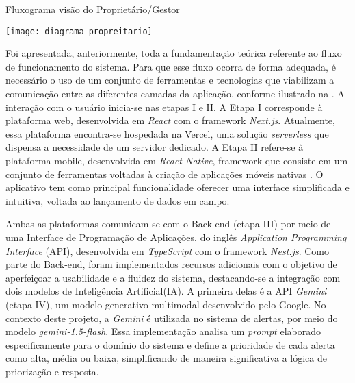 \begin{flowchart}[!htb]
\centering
\caption{Fluxograma visão do Proprietário/Gestor}%
\label{fcht:fluxograma2}
\texttt{[image: diagrama\_propreitario]}
\end{flowchart}

Foi apresentada, anteriormente, toda a fundamentação teórica referente ao fluxo de funcionamento do sistema. Para que esse fluxo ocorra de forma adequada, é necessário o uso de um conjunto de ferramentas e tecnologias que viabilizam a comunicação entre as diferentes camadas da aplicação, conforme ilustrado na . A interação com o usuário inicia-se nas etapas I e II. A Etapa I corresponde à plataforma web, desenvolvida em \textit{React} com o framework \textit{Next.js}. Atualmente, essa plataforma encontra-se hospedada na Vercel, uma solução \textit{serverless} que dispensa a necessidade de um servidor dedicado. A Etapa II refere-se à plataforma mobile, desenvolvida em \textit{React Native}, framework que consiste em um conjunto de ferramentas voltadas à criação de aplicações móveis nativas \cite{Bruna2021}. O aplicativo tem como principal funcionalidade oferecer uma interface simplificada e intuitiva, voltada ao lançamento de dados em campo.

Ambas as plataformas comunicam-se com o Back-end (etapa III) por meio de uma Interface de Programação de Aplicações, do inglês \textit{Application Programming Interface} (API), desenvolvida em \textit{TypeScript} com o framework \textit{Nest.js}. Como parte do Back-end, foram implementados recursos adicionais com o objetivo de aperfeiçoar a usabilidade e a fluidez do sistema, destacando-se a integração com dois modelos de Inteligência Artificial(IA). A primeira delas é a API \textit{Gemini} (etapa IV), um modelo generativo multimodal desenvolvido pelo Google. No contexto deste projeto, a \textit{Gemini} é utilizada no sistema de alertas, por meio do modelo \textit{gemini-1.5-flash}. Essa implementação analisa um \textit{prompt} elaborado especificamente para o domínio do sistema e define a prioridade de cada alerta como alta, média ou baixa, simplificando de maneira significativa a lógica de priorização e resposta.

